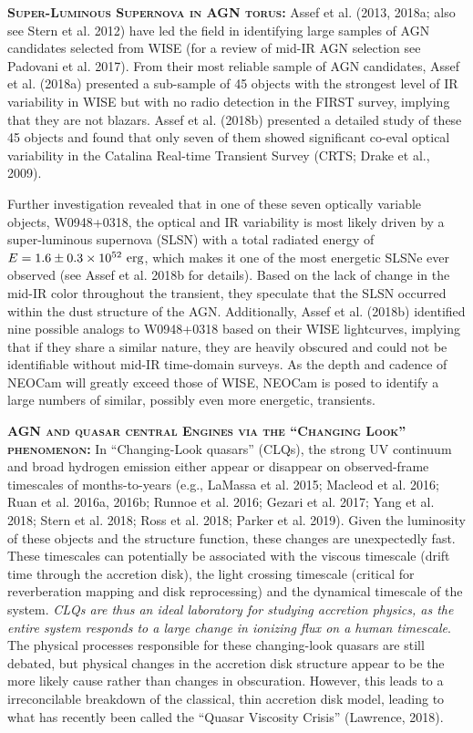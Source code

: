 \documentclass[12pt]{article}
\begin{document}
\smallskip
\smallskip
\noindent
\textbf{\textsc{Super-Luminous Supernova in AGN torus: }} 
Assef et al. (2013, 2018a; also see Stern et al. 2012) have led the field in identifying large samples of AGN candidates selected from WISE (for a review of mid-IR AGN selection see Padovani et al. 2017). From their most reliable sample of AGN candidates, Assef et al. (2018a) presented a sub-sample of 45 objects with the strongest level of IR variability in WISE but with no radio detection in the FIRST survey, implying that they are not blazars. Assef et al. (2018b) presented a detailed study of these 45 objects and found that only seven of them showed significant co-eval optical variability in the Catalina Real-time Transient Survey (CRTS; Drake et al., 2009). 

\smallskip
\smallskip
\noindent
Further investigation revealed that in one of these seven optically
variable objects, W0948+0318, the optical and IR variability is most
likely driven by a super-luminous supernova (SLSN) with a total
radiated energy of $E=1.6\pm 0.3 \times 10^{52}~\rm erg$, which makes
it one of the most energetic SLSNe ever observed (see Assef et
al. 2018b for details). Based on the lack of change in the mid-IR
color throughout the transient, they speculate that the SLSN occurred
within the dust structure of the AGN. Additionally, Assef et
al. (2018b) identified nine possible analogs to W0948+0318 based on
their WISE lightcurves, implying that if they share a similar nature,
they are heavily obscured and could not be identifiable without mid-IR
time-domain surveys. As the depth and cadence of NEOCam will greatly
exceed those of WISE, NEOCam is posed to identify a large numbers of
similar, possibly even more energetic, transients.


\smallskip
\smallskip
\noindent
\textbf{\textsc{AGN and quasar central Engines via the ``Changing Look'' phenomenon: }} 
In ``Changing-Look quasars'' (CLQs), the strong UV continuum and broad hydrogen emission either appear or disappear on observed-frame timescales of months-to-years (e.g., LaMassa et al. 2015; Macleod et al. 2016; Ruan et al. 2016a, 2016b; Runnoe et al. 2016; Gezari et al. 2017; Yang et al. 2018; Stern et al. 2018; Ross et al. 2018; Parker et al. 2019). Given the luminosity of these objects and the structure function, these changes are unexpectedly fast. These timescales can potentially be associated with the viscous timescale (drift time through the accretion disk), the light crossing timescale (critical for reverberation mapping and disk reprocessing) and the dynamical timescale of the system.  {\it CLQs are thus an ideal laboratory for studying accretion physics, as the entire system responds to a large change in ionizing flux on a human timescale}. The physical processes responsible for these changing-look quasars are still debated, but physical changes in the accretion disk structure appear to be the more likely cause rather than changes in obscuration. However, this leads to a irreconcilable breakdown of the classical, thin accretion disk model, leading to what has recently been called the ``Quasar Viscosity Crisis'' (Lawrence, 2018). 
\end{document}
